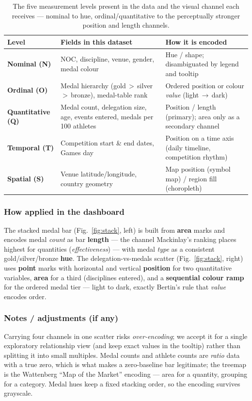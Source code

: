 \documentclass[11pt]{article}
\newcommand{\howapplied}{\subsubsection*{\color{ocean}How applied in the dashboard}}
\newcommand{\notesadj}{\subsubsection*{\color{coral}Notes / adjustments (if any)}}
\begin{document}
\begin{table}[htbp]
\centering\small\sffamily
\renewcommand{\arraystretch}{1.22}
\begin{tabularx}{\linewidth}{l X X}
\toprule
\rowcolor{charcoal}\textbf{\color{white}Level} & \textbf{\color{white}Fields in this dataset} & \textbf{\color{white}How it is encoded} \\
\midrule
\textbf{Nominal (N)}      & NOC, discipline, venue, gender, medal colour & Hue / shape; disambiguated by legend and tooltip \\
\textbf{Ordinal (O)}      & Medal hierarchy (gold\,$>$\,silver\,$>$\,bronze), medal-table rank & Ordered position or colour \emph{value} (light\,$\to$\,dark) \\
\textbf{Quantitative (Q)} & Medal count, delegation size, age, events entered, medals per 100 athletes & Position / length (primary); area only as a secondary channel \\
\textbf{Temporal (T)}     & Competition start \& end dates, Games day & Position on a time axis (daily timeline, competition rhythm) \\
\textbf{Spatial (S)}      & Venue latitude/longitude, country geometry & Map position (symbol map) / region fill (choropleth) \\
\bottomrule
\end{tabularx}
\caption{The five measurement levels present in the data and the visual channel
each receives --- nominal to hue, ordinal/quantitative to the perceptually
stronger position and length channels.}
\label{tab:datatypes}
\end{table}
\howapplied
The stacked medal bar (Fig.~\ref{fig:stack}, left) is built from \textbf{area}
marks and encodes medal \emph{count} as bar \textbf{length} --- the channel
Mackinlay's ranking places highest for quantities (\emph{effectiveness}) --- with
medal \emph{type} as a consistent gold/silver/bronze \textbf{hue}. The
delegation-vs-medals scatter (Fig.~\ref{fig:stack}, right) uses \textbf{point}
marks with horizontal and vertical \textbf{position} for two quantitative
variables, \textbf{area} for a third (disciplines entered), and a
\textbf{sequential colour ramp} for the ordered medal tier --- light to dark,
exactly Bertin's rule that \emph{value} encodes order.
\notesadj
Carrying four channels in one scatter risks \emph{over-encoding}; we accept it for
a single exploratory relationship view (and keep exact values in the tooltip)
rather than splitting it into small multiples. Medal counts and athlete counts are
\emph{ratio} data with a true zero, which is what makes a zero-baseline bar
legitimate; the treemap is the Wattenberg ``Map of the Market''
encoding --- area for a quantity, grouping for a category. Medal hues keep a fixed
stacking order, so the encoding survives grayscale.
\end{document}
